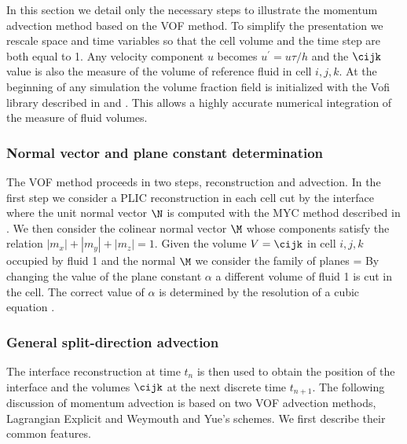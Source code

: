 In this section we detail only the necessary steps to 
illustrate the momentum advection method based on the VOF method.
To simplify the presentation we rescale space and time variables so 
that the cell volume and the time step are both equal to 1. 
Any velocity component $u$ becomes $u^\prime = u \tau / h$ and 
the $\cijk$ value is also the measure of the volume of reference fluid in cell 
$i,j,k$.
At the beginning of any simulation the volume fraction field is
initialized with the {\sc Vofi} library described in \cite{bna2015numerical} 
and \cite{bna2016vofi}. This allows a highly accurate numerical integration of 
the measure of fluid volumes. 

\subsubsection{Normal vector and plane constant determination} 

The VOF method proceeds in two steps, reconstruction and advection. 
In the first step we consider a PLIC reconstruction in each cell cut by the 
interface where the unit normal vector $\N$ is computed 
with the MYC method described in \cite{Tryggvason11}. We then consider
the colinear normal vector $\M$ whose components satisfy the relation
$|m_x| + |m_y| + |m_z|=1$. Given the
volume $V=\cijk$ in cell $i,j,k$ occupied by fluid 1 and the normal $\M$
we consider the family of planes 
\be 
\M \cdot \X = \alpha \label{mxalpha}
\nd 
By changing the value of the plane constant $\alpha$ a different
volume of fluid 1 is cut in the cell. The correct value of
$\alpha$ is determined by the resolution of a cubic equation \cite{Scardovelli00}.

\subsubsection{General split-direction advection}
\label{generalsplit}
The interface reconstruction at time $t_{n}$ is then used to obtain the  
position of the interface and the volumes $\cijk$ at the next discrete time $t_{n+1}$. 
The following discussion of momentum advection is based on 
two VOF advection methods, Lagrangian Explicit and Weymouth and Yue's 
schemes. We first describe their common features. 

